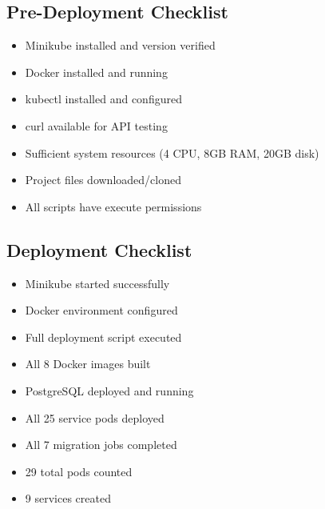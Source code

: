 \documentclass[12pt,a4paper]{article}
\begin{document}
\subsection{Pre-Deployment Checklist}
\begin{itemize}[label=$\square$]
    \item Minikube installed and version verified
    \item Docker installed and running
    \item kubectl installed and configured
    \item curl available for API testing
    \item Sufficient system resources (4 CPU, 8GB RAM, 20GB disk)
    \item Project files downloaded/cloned
    \item All scripts have execute permissions
\end{itemize}

\subsection{Deployment Checklist}
\begin{itemize}[label=$\square$]
    \item Minikube started successfully
    \item Docker environment configured
    \item Full deployment script executed
    \item All 8 Docker images built
    \item PostgreSQL deployed and running
    \item All 25 service pods deployed
    \item All 7 migration jobs completed
    \item 29 total pods counted
    \item 9 services created
\end{itemize}
\end{document}
